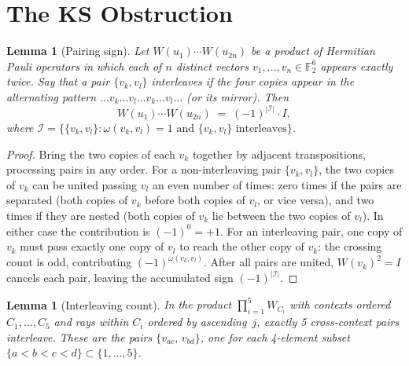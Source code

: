 \documentclass[11pt,a4paper]{article}
\newtheorem{lemma}[theorem]{Lemma}
\theoremstyle{remark}
\begin{document}
\section{The KS Obstruction}\label{sec:ks}

\begin{lemma}[Pairing sign]\label{lem:pair}
Let $W(u_1)\cdots W(u_{2n})$ be a product of Hermitian Pauli operators
in which each of $n$ distinct vectors $v_1,\ldots,v_n \in \mathbb{F}_2^6$
appears exactly twice.
Say that a pair $\{v_k, v_l\}$ \emph{interleaves} if the four copies
appear in the alternating pattern
$\ldots v_k \ldots v_l \ldots v_k \ldots v_l \ldots$
(or its mirror).
Then
\[
  W(u_1)\cdots W(u_{2n}) \;=\; (-1)^{|\mathcal{I}|} \cdot I,
\]
where $\mathcal{I} = \bigl\{\{v_k,v_l\} : \omega(v_k,v_l) = 1
\text{ and } \{v_k,v_l\} \text{ interleaves}\bigr\}$.
\end{lemma}

\begin{proof}
Bring the two copies of each $v_k$ together by adjacent transpositions,
processing pairs in any order.
For a non-interleaving pair $\{v_k,v_l\}$, the two copies of $v_k$
can be united passing $v_l$ an even number of times:
zero times if the pairs are separated (both copies of $v_k$ before
both copies of $v_l$, or vice versa), and two times if they are
nested (both copies of $v_k$ lie between the two copies of $v_l$).
In either case the contribution is $(-1)^0 = +1$.
For an interleaving pair, one copy of $v_k$ must pass exactly one copy
of $v_l$ to reach the other copy of $v_k$: the crossing count is odd,
contributing $(-1)^{\omega(v_k,v_l)}$.
After all pairs are united, $W(v_k)^2 = I$ cancels each pair,
leaving the accumulated sign $(-1)^{|\mathcal{I}|}$.
\end{proof}

\begin{lemma}[Interleaving count]\label{lem:interleave}
In the product $\prod_{i=1}^5 W_{C_i}$ with contexts ordered
$C_1,\ldots,C_5$ and rays within $C_i$ ordered by ascending~$j$,
exactly \emph{5} cross-context pairs interleave.
These are the pairs $\{v_{ac},\, v_{bd}\}$, one for each 4-element
subset $\{a < b < c < d\} \subset \{1,\ldots,5\}$.
\end{lemma}
\end{document}
